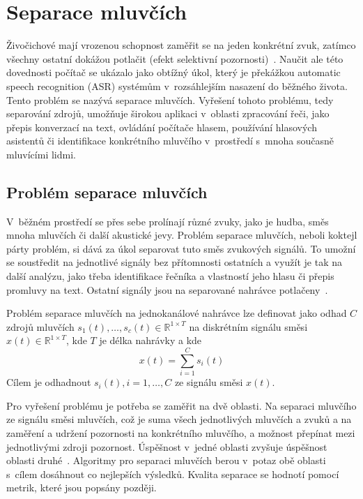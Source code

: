 \chapter{Separace mluvčích}
\label{separace}
Živočichové mají vrozenou schopnost zaměřit se na jeden konkrétní zvuk, zatímco všechny ostatní dokážou potlačit (efekt selektivní pozornosti)~\cite{GETZMANN20171}. Naučit ale této dovednosti počítač se ukázalo jako obtížný úkol, který je překážkou automatic speech recognition (ASR) systémům v~rozsáhlejším nasazení do běžného života. Tento problém se nazývá separace mluvčích. Vyřešení tohoto problému, tedy separování zdrojů, umožňuje širokou aplikaci v~oblasti zpracování řeči, jako přepis konverzací na text, ovládání počítače hlasem, používání hlasových asistentů či identifikace konkrétního mluvčího v~prostředí s~mnoha současně mluvícími lidmi.


\section{Problém separace mluvčích}
V~běžném prostředí se přes sebe prolínají různé zvuky, jako je hudba, směs mnoha mluvčích či další akustické jevy. Problém separace mluvčích, neboli koktejl párty problém, si dává za úkol separovat tuto směs zvukových signálů. To umožní se soustředit na jednotlivé signály bez přítomnosti ostatních a využít je tak na další analýzu, jako třeba identifikace řečníka a vlastností jeho hlasu či přepis promluvy na text. Ostatní signály jsou na separované nahrávce potlačeny~\cite{speechseparation}.

Problém separace mluvčích na jednokanálové nahrávce lze definovat jako odhad $C$ zdrojů mluvčích $s_1(t), \dots, s_c(t) \in \mathbb{R}^{1 \times T}$ na diskrétním signálu směsi $x(t)\in \mathbb{R}^{1 \times T}$, kde $T$ je délka nahrávky a kde
\begin{equation}
  x(t) = \sum_{i=1}^C s_i(t)
  \label{equ:definiceseparace}
\end{equation}
Cílem je odhadnout $s_i(t), i = 1, \dots, C$ ze signálu směsi $x(t)$.

Pro vyřešení problému je potřeba se zaměřit na dvě oblasti. Na separaci mluvčího ze signálu směsi mluvčích, což je suma všech jednotlivých mluvčích a zvuků a na zaměření a udržení pozornosti na konkrétního mluvčího, a možnost přepínat mezi jednotlivými zdroji pozornost. Úspěšnost v~jedné oblasti zvyšuje úspěšnost oblasti druhé~\cite{speechseparation}. Algoritmy pro separaci mluvčích berou v~potaz obě oblasti s~cílem dosáhnout co nejlepších výsledků. Kvalita separace se hodnotí pomocí metrik, které jsou popsány později. 


